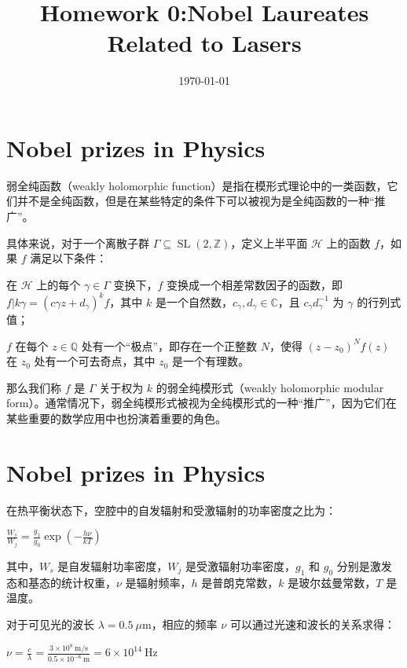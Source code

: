 \documentclass[12pt, a4paper, oneside]{article}
\title{Homework 0:Nobel Laureates Related to Lasers}
\date{\today}
\author{}
\begin{document}
\begin{spacing}{2.0}
\maketitle


\section{Nobel prizes in Physics}





弱全纯函数（weakly holomorphic function）是指在模形式理论中的一类函数，它们并不是全纯函数，但是在某些特定的条件下可以被视为是全纯函数的一种“推广”。

具体来说，对于一个离散子群 $\Gamma\subseteq \operatorname{SL}(2,\mathbb{Z})$，定义上半平面 $\mathcal{H}$ 上的函数 $f$，如果 $f$ 满足以下条件：

在 $\mathcal{H}$ 上的每个 $\gamma\in\Gamma$ 变换下，$f$ 变换成一个相差常数因子的函数，即 $f|{k}\gamma = (c{\gamma}z+d_{\gamma})^kf$，其中 $k$ 是一个自然数，$c_{\gamma},d_{\gamma}\in \mathbb{C}$，且 $c_{\gamma}d_{\gamma}^{-1}$ 为 $\gamma$ 的行列式值；

$f$ 在每个 $z\in \mathbb{Q}$ 处有一个“极点”，即存在一个正整数 $N$，使得 $(z-z_0)^N f(z)$ 在 $z_0$ 处有一个可去奇点，其中 $z_0$ 是一个有理数。

那么我们称 $f$ 是 $\Gamma$ 关于权为 $k$ 的弱全纯模形式（weakly holomorphic modular form）。通常情况下，弱全纯模形式被视为全纯模形式的一种“推广”，因为它们在某些重要的数学应用中也扮演着重要的角色。

\section{Nobel prizes in Physics}

在热平衡状态下，空腔中的自发辐射和受激辐射的功率密度之比为：

$\frac{W_s}{W_j} = \frac{g_1}{g_0}\exp\left(-\frac{h\nu}{kT}\right)$

其中，$W_s$ 是自发辐射功率密度，$W_j$ 是受激辐射功率密度，$g_1$ 和 $g_0$ 分别是激发态和基态的统计权重，$\nu$ 是辐射频率，$h$ 是普朗克常数，$k$ 是玻尔兹曼常数，$T$ 是温度。

对于可见光的波长 $\lambda = 0.5\ \mu\text{m}$，相应的频率 $\nu$ 可以通过光速和波长的关系求得：

$\nu = \frac{c}{\lambda} = \frac{3 \times 10^8\ \text{m/s}}{0.5 \times 10^{-6}\ \text{m}} = 6 \times 10^{14}\ \text{Hz}$


\end{spacing}
\end{document}
